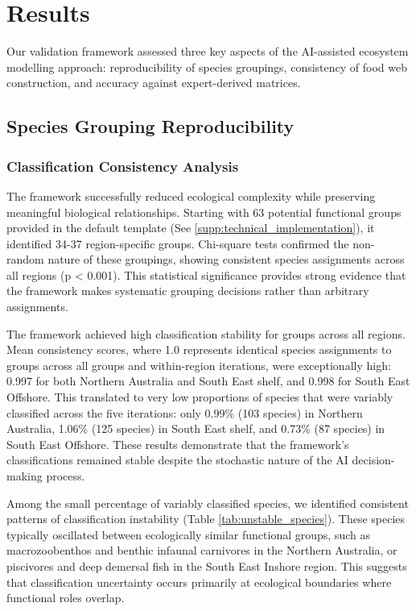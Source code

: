 \section{Results}

Our validation framework assessed three key aspects of the AI-assisted ecosystem modelling approach: reproducibility of species groupings, consistency of food web construction, and accuracy against expert-derived matrices.

\subsection{Species Grouping Reproducibility}

\subsubsection{Classification Consistency Analysis}
The framework successfully reduced ecological complexity while preserving meaningful biological relationships. Starting with 63 potential functional groups provided in the default template (See \ref{supp:technical_implementation}), it identified 34-37 region-specific groups. Chi-square tests confirmed the non-random nature of these groupings, showing consistent species assignments across all regions (p < 0.001). This statistical significance provides strong evidence that the framework makes systematic grouping decisions rather than arbitrary assignments.

The framework achieved high classification stability for groups across all regions. Mean consistency scores, where 1.0 represents identical species assignments to groups across all groups and within-region iterations, were exceptionally high: 0.997 for both Northern Australia and South East shelf, and 0.998 for South East Offshore. This translated to very low proportions of species that were variably classified across the five iterations: only 0.99\% (103 species) in Northern Australia, 1.06\% (125 species) in South East shelf, and 0.73\% (87 species) in South East Offshore. These results demonstrate that the framework's classifications remained stable despite the stochastic nature of the AI decision-making process.

Among the small percentage of variably classified species, we identified consistent patterns of classification instability (Table \ref{tab:unstable_species}). These species typically oscillated between ecologically similar functional groups, such as macrozoobenthos and benthic infaunal carnivores in the Northern Australia, or piscivores and deep demersal fish in the South East Inshore region. This suggests that classification uncertainty occurs primarily at ecological boundaries where functional roles overlap.

